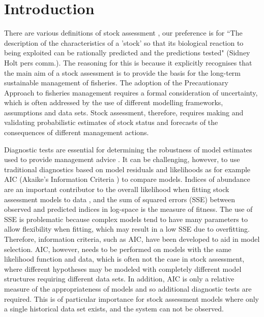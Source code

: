 \documentclass[12pt,halfline,a4paper,nonumbib]{ouparticle}
\begin{document}
\date{\today}


\maketitle

\section{Introduction}

There are various definitions of stock assessment \parencite[e.g.][]{hilborn2003state,cadrin2014stock}, our preference is for ``The description of the characteristics of a 'stock' so that its biological reaction to being exploited can be rationally predicted and the predictions tested" (Sidney Holt pers comm.). The reasoning for this is  because it explicitly recognises that the main aim of a stock assessment is to provide the basis for the long-term sustainable management of fisheries. The adoption of the Precautionary Approach to fisheries management \parencite[PA,][]{garcia1996precautionary} requires a formal consideration of uncertainty, which is often addressed by the use of different modelling frameworks, assumptions and data sets. Stock assessment, therefore, requires making and validating probabilistic estimates of stock status and forecasts of the consequences of different management actions. 

Diagnostic tests are essential for determining the robustness of model estimates used to provide management advice \parencite{carvalho2020cookbook}. It can be challenging, however, to use traditional diagnostics based on model residuals and likelihoods as for example AIC (Akaike’s Information Criteria  \parencite[AIC,][]{akaike1998information}) to compare models. Indices of abundance are an important contributor to the overall likelihood when fitting stock assessment models to data \parencite{whitten2013accounting}, and the sum of squared errors (SSE) between observed and predicted indices in log-space is the measure of fitness. The use of SSE is problematic because complex models tend to have many parameters to allow flexibility when fitting, which may result in a low SSE due to overfitting. Therefore, information criteria, such as AIC, have been developed to aid in model selection. AIC, however, needs to be performed on models with the same likelihood function and data, which is often not the case in stock assessment, where different hypotheses may be modeled with completely different model structures requiring different data sets. In addition, AIC is only a relative measure of the appropriateness of models and so additional diagnostic tests are required. This is of particular importance for stock assessment models where only a single historical data set exists, and the system can not be observed. 
\end{document}
